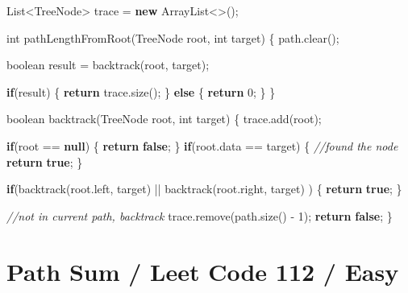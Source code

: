 \documentclass[]{book}
\newenvironment{Shaded}{\begin{snugshade}}{\end{snugshade}}
\newcommand{\BuiltInTok}[1]{#1}
\newcommand{\CommentTok}[1]{\textcolor[rgb]{0.56,0.35,0.01}{\textit{#1}}}
\newcommand{\DataTypeTok}[1]{\textcolor[rgb]{0.13,0.29,0.53}{#1}}
\newcommand{\DecValTok}[1]{\textcolor[rgb]{0.00,0.00,0.81}{#1}}
\newcommand{\FunctionTok}[1]{\textcolor[rgb]{0.00,0.00,0.00}{#1}}
\newcommand{\KeywordTok}[1]{\textcolor[rgb]{0.13,0.29,0.53}{\textbf{#1}}}
\newcommand{\NormalTok}[1]{#1}
\begin{document}
\begin{Shaded}
\begin{Highlighting}[]
\BuiltInTok{List}\NormalTok{<}\BuiltInTok{TreeNode}\NormalTok{> trace = }\KeywordTok{new} \BuiltInTok{ArrayList}\NormalTok{<>();}

\DataTypeTok{int} \FunctionTok{pathLengthFromRoot}\NormalTok{(}\BuiltInTok{TreeNode}\NormalTok{ root, }\DataTypeTok{int}\NormalTok{ target) \{}
\NormalTok{    path.}\FunctionTok{clear}\NormalTok{();}

    \DataTypeTok{boolean}\NormalTok{ result = }\FunctionTok{backtrack}\NormalTok{(root, target);}

    \KeywordTok{if}\NormalTok{(result) \{}
        \KeywordTok{return}\NormalTok{ trace.}\FunctionTok{size}\NormalTok{();}
\NormalTok{    \} }\KeywordTok{else}\NormalTok{ \{}
        \KeywordTok{return} \DecValTok{0}\NormalTok{;}
\NormalTok{    \}}
\NormalTok{\}}

\DataTypeTok{boolean} \FunctionTok{backtrack}\NormalTok{(}\BuiltInTok{TreeNode}\NormalTok{ root, }\DataTypeTok{int}\NormalTok{ target) \{}
\NormalTok{    trace.}\FunctionTok{add}\NormalTok{(root);}

    \KeywordTok{if}\NormalTok{(root == }\KeywordTok{null}\NormalTok{) \{}
        \KeywordTok{return} \KeywordTok{false}\NormalTok{;}
\NormalTok{    \}}
    \KeywordTok{if}\NormalTok{(root.}\FunctionTok{data}\NormalTok{ == target) \{}
        \CommentTok{//found the node}
        \KeywordTok{return} \KeywordTok{true}\NormalTok{;}
\NormalTok{    \}}

    \KeywordTok{if}\NormalTok{(}\FunctionTok{backtrack}\NormalTok{(root.}\FunctionTok{left}\NormalTok{, target) || }\FunctionTok{backtrack}\NormalTok{(root.}\FunctionTok{right}\NormalTok{, target) ) \{}
        \KeywordTok{return} \KeywordTok{true}\NormalTok{;}
\NormalTok{    \}}

    \CommentTok{//not in current path, backtrack}
\NormalTok{    trace.}\FunctionTok{remove}\NormalTok{(path.}\FunctionTok{size}\NormalTok{() - }\DecValTok{1}\NormalTok{);}
    \KeywordTok{return} \KeywordTok{false}\NormalTok{;}
\NormalTok{\}}
\end{Highlighting}
\end{Shaded}

\hypertarget{path-sum-leet-code-112-easy}{%
\section{Path Sum / Leet Code 112 / Easy}\label{path-sum-leet-code-112-easy}}
\end{document}
